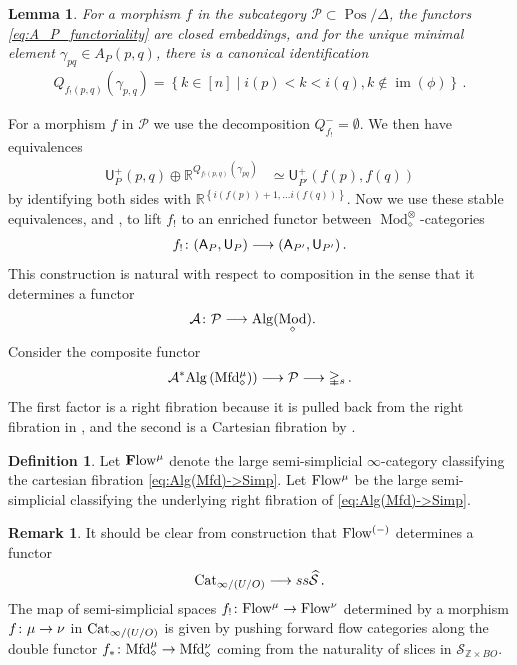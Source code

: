 \documentclass[10pt]{amsart}
\numberwithin{equation}{section}
\newtheorem{lem}[prop]{Lemma}
\theoremstyle{definition}
\newtheorem{definition}[prop]{Definition}
\newtheorem{rem}[prop]{Remark}
\DeclareMathOperator{\im}{im}
\DeclareMathOperator{\Mod}{Mod}
\DeclareMathOperator{\Pos}{Pos}
\newcommand{\PreFlow}{\mathrm{Flow}\vphantom{w}}
\newcommand{\bfPreFlow}{\mathbf{F}\mathrm{low}\vphantom{w}}
\newcommand{\Cat}{\mathrm{Cat}\vphantom{t}}
\newcommand{\Mfd}{\mathrm{Mfd}\vphantom{d}}
\newcommand{\Alg}{\mathrm{Alg}\vphantom{z}}
\newcommand{\bZ}{\mathbb{Z}}
\newcommand{\bR}{\mathbb{R}}
\newcommand{\Simp}{\mathbb{\Delta}}
\newcommand{\cA}{\mathcal{A}}
\newcommand{\cP}{\mathcal{P}}
\newcommand{\cS}{\mathcal{S}}
\newcommand{\sfA}{\mathsf{A}}
\newcommand{\sfU}{\mathsf{U}}
\renewcommand{\to}{\mathchoice{\longrightarrow}{\rightarrow}{}{}}
\begin{document}
\begin{lem}\label{lem:A_P_closed_embedding}
	For a morphism $f$ in the subcategory $\cP\subset \Pos/\Simp$, the functors \eqref{eq:A_P_functoriality} are closed embeddings, and for the unique minimal element $\gamma_{pq} \in A_{P}(p,q)$, there is a canonical identification
	\begin{align*}
		Q_{f_!(p,q)}(\gamma_{p,q}) = \left\{k \in [n] \mid i(p)<k<i(q), k\notin \im(\phi) \right\} \,.
	\end{align*}
\end{lem}

For a morphism $f$ in $\cP$ we use the decomposition $Q_{f_{!}}^{-}=\emptyset$. We then have equivalences
\begin{align*}
	\sfU^{+}_{P }(p,q)
	\oplus \bR^{Q_{f_{!}(p,q)}(\gamma_{pq})}
	& \simeq \sfU^{+}_{P'}(f(p), f(q))
\end{align*}
by identifying both sides with $\bR^{ \left\{i(f(p))+1,\dots i(f(q))\right\}}$. Now we use these stable equivalences, and , to lift $f_!$ to an enriched functor between $\Mod_{\diamond}^{\otimes}$-categories
\begin{align*}
	f_{!} \colon (\sfA_{P}, \sfU_{P}) \to (\sfA_{P'}, \sfU_{P'}) \,.
\end{align*}
This construction is natural with respect to composition in the sense that it determines a functor
\begin{align*}
	\cA \colon \cP &\to \Alg(\Mod_{\diamond}).
\end{align*}
Consider the composite functor
\begin{align}\label{eq:Alg(Mfd)->Simp}
	\cA^{*}\Alg\left(\Mfd^{\mu}_{\diamond}\right)) \to \cP \to \Simp_{s} \,.
\end{align}
The first factor is a right fibration because it is pulled back from the right fibration in , and the second is a Cartesian fibration by .

\begin{definition}\label{def:PreFlow_mu}
	Let $\bfPreFlow^{\mu}$ denote the large semi-simplicial $\infty$-category classifying the cartesian fibration \eqref{eq:Alg(Mfd)->Simp}. Let $\PreFlow^{\mu}$ be the large semi-simplicial classifying the underlying right fibration of \eqref{eq:Alg(Mfd)->Simp}.
\end{definition}

\begin{rem}\label{rem:PreFlow_is_functorial}
	It should be clear from construction that $\PreFlow^{(-)}$ determines a functor
	\begin{align*}
		\Cat_{\infty /(U/O)} \to ss\widehat{\cS} \,.
	\end{align*}
	The map of semi-simplicial spaces $f_{!}\colon \PreFlow^{\mu} \to \PreFlow^{\nu}$ determined by a morphism $f\colon \mu\to \nu$ in $\Cat_{\infty/(U/O)}$ is given by pushing forward flow categories along the double functor $f_{*}\colon \Mfd^{\mu}_{\diamond} \to \Mfd^{\nu}_{\diamond}$ coming from the naturality of slices in $\cS_{\bZ\times BO}$.
\end{rem}
\end{document}
